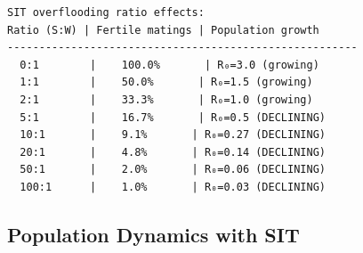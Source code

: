\begin{verbatim}
SIT overflooding ratio effects:
Ratio (S:W) | Fertile matings | Population growth
-------------------------------------------------------
  0:1        |    100.0%       | R₀=3.0 (growing)
  1:1        |    50.0%       | R₀=1.5 (growing)
  2:1        |    33.3%       | R₀=1.0 (growing)
  5:1        |    16.7%       | R₀=0.5 (DECLINING)
  10:1       |    9.1%       | R₀=0.27 (DECLINING)
  20:1       |    4.8%       | R₀=0.14 (DECLINING)
  50:1       |    2.0%       | R₀=0.06 (DECLINING)
  100:1      |    1.0%       | R₀=0.03 (DECLINING)
\end{verbatim}



\subsection{Population Dynamics with SIT}



\label{13559943147325031085}{}



